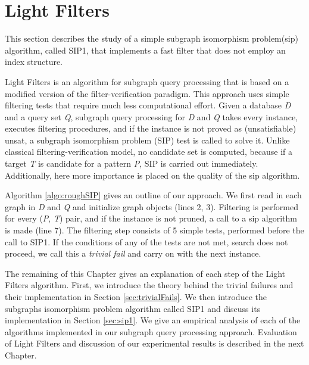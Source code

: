 \documentclass{l4proj}
\begin{document}


\chapter{Light Filters}
\label{ch:sip1}
This section describes the study of a simple subgraph isomorphism problem(\gls{sip}) algorithm, called SIP1, that implements a fast filter that does not employ an index structure.

Light Filters is an algorithm for subgraph query processing that is based on a modified version of the filter-verification paradigm. This approach uses simple filtering tests that require much less computational effort. 
Given a database \emph{D} and a query set \emph{Q}, subgraph query processing for \emph{D} and \emph{Q} takes every instance, executes filtering procedures, and if the instance is not proved as (unsatisfiable) \gls{unsat}, a subgraph isomorphism problem (SIP) test is called to solve it. Unlike classical filtering-verification model, no candidate set is computed, because if a target \emph{T} is candidate for a pattern \emph{P}, SIP is carried out immediately. Additionally, here more importance is placed on the quality of the \gls{sip} algorithm. 

Algorithm \ref{algo:roughSIP} gives an outline of our approach. We first read in each graph in \emph{D} and \emph{Q} and initialize graph objects (lines 2, 3). Filtering is performed for every (\emph{P}, \emph{T}) pair,  and if the instance is not pruned, a call to a \gls{sip} algorithm is made (line 7). The filtering step consists of 5 simple tests, performed before the call to SIP1. If the conditions of any of the tests are not met, search does not proceed, we call this a \emph{trivial fail} and carry on with the next instance. 

The remaining of this Chapter gives an explanation of each step of the Light Filters algorithm. First, we introduce the theory behind the trivial failures and their implementation in Section \ref{sec:trivialFails}. We then introduce the subgraphs isomorphism problem algorithm called SIP1 and discuss its implementation in Section \ref{sec:sip1}. We give an empirical analysis of each of the algorithms implemented in our subgraph query processing approach. Evaluation of Light Filters and discussion of our experimental results is described in the next Chapter.
\end{document}

